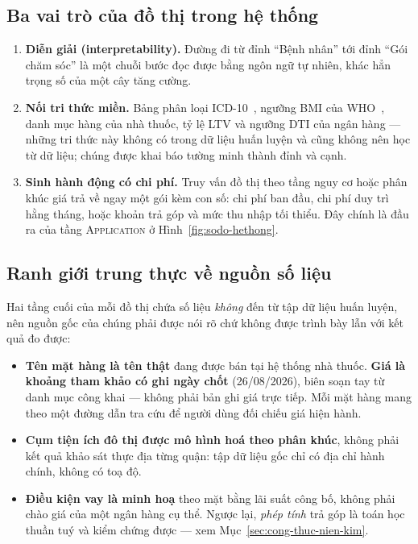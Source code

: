 \subsection{Ba vai trò của đồ thị trong hệ thống}

\begin{enumerate}
  \item \textbf{Diễn giải (interpretability).} Đường đi từ đỉnh ``Bệnh nhân''
        tới đỉnh ``Gói chăm sóc'' là một chuỗi bước đọc được bằng ngôn ngữ tự
        nhiên, khác hẳn trọng số của một cây tăng cường.
  \item \textbf{Nối tri thức miền.} Bảng phân loại ICD-10~\cite{icd10}, ngưỡng BMI của WHO~\cite{who2000},
        danh mục hàng của nhà thuốc, tỷ lệ LTV và ngưỡng DTI của ngân hàng ---
        những tri thức này không có trong dữ liệu huấn luyện và cũng không nên
        học từ dữ liệu; chúng được khai báo tường minh thành đỉnh và cạnh.
  \item \textbf{Sinh hành động có chi phí.} Truy vấn đồ thị theo tầng nguy cơ
        hoặc phân khúc giá trả về ngay một gói kèm con số: chi phí ban đầu, chi
        phí duy trì hằng tháng, hoặc khoản trả góp và mức thu nhập tối thiểu.
        Đây chính là đầu ra của tầng \textsc{Application} ở
        Hình~\ref{fig:sodo-hethong}.
\end{enumerate}

\subsection{Ranh giới trung thực về nguồn số liệu}
\label{sec:ranh-gioi-so-lieu}

Hai tầng cuối của mỗi đồ thị chứa số liệu \emph{không} đến từ tập dữ liệu huấn
luyện, nên nguồn gốc của chúng phải được nói rõ chứ không được trình bày lẫn
với kết quả đo được:

\begin{itemize}
  \item \textbf{Tên mặt hàng là tên thật} đang được bán tại hệ thống nhà thuốc.
        \textbf{Giá là khoảng tham khảo có ghi ngày chốt} (26/08/2026), biên
        soạn tay từ danh mục công khai --- không phải bản ghi giá trực tiếp. Mỗi
        mặt hàng mang theo một đường dẫn tra cứu để người dùng đối chiếu giá
        hiện hành.
  \item \textbf{Cụm tiện ích đô thị được mô hình hoá theo phân khúc}, không
        phải kết quả khảo sát thực địa từng quận: tập dữ liệu gốc chỉ có địa chỉ
        hành chính, không có toạ độ.
  \item \textbf{Điều kiện vay là minh hoạ} theo mặt bằng lãi suất công bố, không
        phải chào giá của một ngân hàng cụ thể. Ngược lại, \emph{phép tính} trả
        góp là toán học thuần tuý và kiểm chứng được --- xem
        Mục~\ref{sec:cong-thuc-nien-kim}.
\end{itemize}

